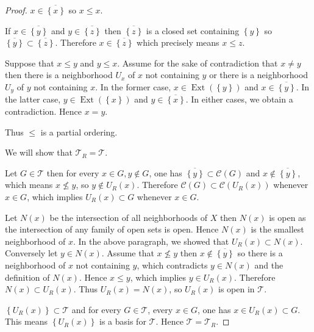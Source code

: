 \begin{proof}
	\( x \in \overline{\left\{ x \right\}} \) so \( x \le x \).

	If \( x \in \overline{\left\{ y \right\}} \) and \( y \in \overline{ \left\{z\right\} } \) then \( \overline{\left\{ z\right\} } \) is a closed set containing \( \left\{ y \right\} \) so \( \overline{ \left\{ y \right\} } \subset \overline{ \left\{ z \right\} } \). Therefore \( x \in \overline{ \left\{ z \right\} } \) which precisely means \( x \le z \).

	Suppose that \( x \le y \) and \( y \le x \). Assume for the sake of contradiction that \( x \ne y \) then there is a neighborhood \( U_{x} \) of \(x\) not containing \( y \) or there is a neighborhood \( U_{y} \) of \(y\) not containing \( x \). In the former case, \( x \in \operatorname{Ext}(\left\{y\right\}) \) and \( x \in \overline{ \left\{y\right\} } \). In the latter case, \( y \in \operatorname{Ext}(\left\{x\right\}) \) and \( y \in \overline{ \left\{x\right\} } \). In either cases, we obtain a contradiction. Hence \( x = y \).

	Thus \( \le \) is a partial ordering.

	\hrulefill%

	We will show that \( \mathscr{T}_{R} = \mathscr{T} \).

	Let \( G \in \mathscr{T} \) then for every \( x \in G, y \notin G \), one has \( \overline{ \left\{y\right\} } \subset \mathscr{C}(G) \) and \( x \notin \overline{ \left\{y\right\} } \), which means \( x \nleq y \), so \( y \notin U_{R}(x) \). Therefore \( \mathscr{C}(G) \subset \mathscr{C}(U_{R}(x)) \) whenever \( x \in G \), which implies \( U_{R}(x) \subset G \) whenever \( x \in G \).

	Let \( N(x) \) be the intersection of all neighborhoods of \(X\) then \( N(x) \) is open as the intersection of any family of open sets is open. Hence \( N(x) \) is the smallest neighborhood of \(x\). In the above paragraph, we showed that \( U_{R}(x) \subset N(x) \). Conversely let \( y \in N(x) \). Assume that \( x \nleq y \) then \( x \notin \overline{\left\{ y \right\}} \) so there is a neighborhood of \( x \) not containing \( y \), which contradicts \( y \in N(x) \) and the definition of \(N(x)\). Hence \( x \le y \), which implies \( y \in U_{R}(x) \). Therefore \( N(x) \subset U_{R}(x) \). Thus \( U_{R}(x) = N(x) \), so \( U_{R}(x) \) is open in \( \mathscr{T} \).

	\( \left\{ U_{R}(x) \right\} \subset \mathscr{T} \) and for every \( G \in \mathscr{T} \), every \( x \in G \), one has \( x \in U_{R}(x) \subset G \). This means \( \left\{ U_{R}(x) \right\} \) is a basis for \( \mathscr{T} \). Hence \( \mathscr{T} = \mathscr{T}_{R} \).
\end{proof}


